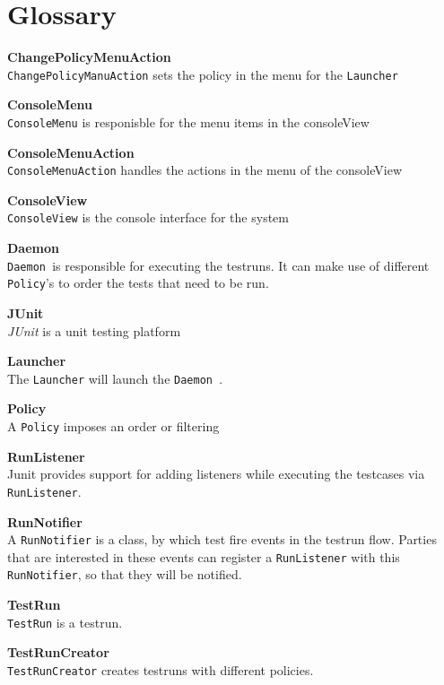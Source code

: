 \documentclass[i3]{oss}
\newcommand{\class}[1]{\texttt{#1}}
\newcommand{\junit}{\emph{JUnit }}
\newcommand{\Daemon}{\class{Daemon  }}
\newcommand{\gloss}[1]{\textbf{#1}}
\begin{document}
\section{Glossary}
\label{ssec:glossary}
\begin{description}
\item \gloss{ChangePolicyMenuAction}\\
\class{ChangePolicyManuAction} sets the policy in the menu for the \class{Launcher}

\item \gloss{ConsoleMenu}\\
\class{ConsoleMenu} is responisble for the menu items in the consoleView

\item \gloss{ConsoleMenuAction}\\
\class{ConsoleMenuAction} handles the actions in the menu of the consoleView

\item \gloss{ConsoleView}\\
\class{ConsoleView} is the console interface for the system

\item \gloss{Daemon} \\
\Daemon is responsible for executing the testruns. It can make use of different \class{Policy}'s to order the tests that need to be run.

\item \gloss{JUnit} \\
\junit is a unit testing platform

\item \gloss{Launcher} \\
The \class{Launcher} will launch the \Daemon .

\item \gloss{Policy} \\
A \class{Policy} imposes an order or filtering 

\item \gloss{RunListener} \\
Junit provides support for adding listeners while executing the testcases via \class{RunListener}. 

\item \gloss{RunNotifier} \\
A \class{RunNotifier} is a class, by which test fire events in the testrun flow.
Parties that are interested in these events can register a \class{RunListener} with this \class{RunNotifier}, so that they will be notified.

\item \gloss{TestRun}\\
\class{TestRun} is a testrun.

\item \gloss{TestRunCreator}\\
\class{TestRunCreator} creates testruns with different policies.

\end{description}
 
\end{document}
